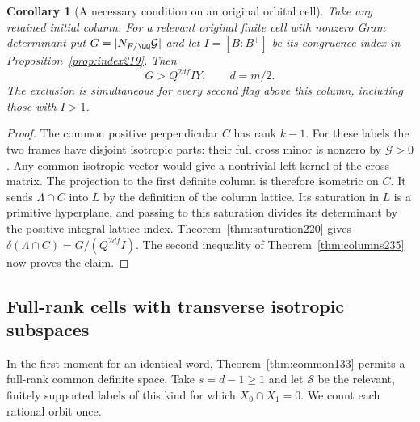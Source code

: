 \documentclass[a4paper,11pt]{article}
\newtheorem{corollary}[proposition]{Corollary}
\theoremstyle{definition}
\theoremstyle{remark}
\numberwithin{equation}{section}
\begin{document}
\begin{corollary}[A necessary condition on an original orbital cell]
\leavevmode\label{cor:gram235}
Take any retained initial column. For a relevant original finite
cell with nonzero Gram determinant put \(G=|N_{F/\QQ}\mathcal G|\)
and let \(I=[B:B^+]\) be its congruence index in
Proposition~\ref{prop:index219}. Then
\[
                       G>Q^{2df} IY,\qquad d=m/2 .
\]
The exclusion is simultaneous for every second flag above this
column, including those with \(I>1\).
\end{corollary}
\begin{proof}
The common positive perpendicular \(C\) has rank \(k-1\).
For these labels the two frames have disjoint isotropic parts:
their full cross minor is nonzero by \(\mathcal G>0\).
Any common isotropic vector would give a nontrivial left kernel
of the cross matrix. The projection to the first definite
column is therefore isometric on \(C\). It sends
\(\Lambda\cap C\) into \(L\) by the definition of the column
lattice. Its saturation in \(L\) is a primitive hyperplane,
and passing to this saturation divides its determinant by the
positive integral lattice index. Theorem~\ref{thm:saturation220}
gives \(\delta(\Lambda\cap C)=G/(Q^{2df}I)\).
The second inequality of Theorem~\ref{thm:columns235} now proves
the claim.
\end{proof}

\subsection{Full-rank cells with transverse isotropic subspaces}\label{nav:IX-31}
In the first moment for an identical word,
Theorem~\ref{thm:common133} permits a full-rank common definite
space. Take \(s=d-1\ge1\) and let \(\mathcal S\) be the
relevant, finitely supported labels of this kind for which
\(X_0\cap X_1=0\). We count each rational orbit once.
\end{document}
